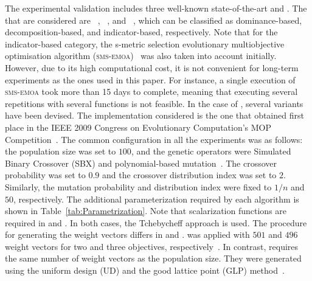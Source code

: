The experimental validation includes three well-known state-of-the-art \MOEAS{} and \VSDMOEA{}.
%
The \MOEAS{} that are considered are \NSGAII{}~\cite{Joel:jMetal}, \MOEAD{}~\cite{MOEADCode}, and \RMOEA{}~\cite{R2EMOACode}, 
which can be classified as dominance-based, decomposition-based, and indicator-based, respectively.
%
Note that for the indicator-based category, the s-metric selection evolutionary multiobjective optimisation algorithm 
(\textsc{sms-emoa})~\cite{Joel:SMSEMOA} was also taken into account initially.
%
However, due to its high computational cost, it is not convenient for long-term experiments as the ones used in this paper.
%
For instance, a single execution of \textsc{sms-emoa} took more than 15 days to complete, meaning that executing several
repetitions with several functions is not feasible.
%
In the case of \MOEAD{}, several variants have been devised.
%
The \MOEAD{} implementation considered is the one that obtained first place in the IEEE 2009 Congress on Evolutionary Computation's 
MOP Competition~\cite{zhang2009performance}.
%
The common configuration in all the experiments was as follows: the population size was set to $100$, and the genetic 
operators were Simulated Binary Crossover (SBX) and polynomial-based 
mutation~\cite{Joel:SBX1994, Joel:Mutation}.
%
The crossover probability was set to $0.9$ and the crossover distribution index was set to $2$.
%
Similarly, the mutation probability and distribution index were fixed to $1/n$ and $50$, respectively.
%
The additional parameterization required by each algorithm is shown in Table~\ref{tab:Parametrization}.
%
Note that scalarization functions are required in \MOEAD{} and \RMOEA{}.
%
In both cases, the Tchebycheff approach is used.
%
The procedure for generating the weight vectors differs in \MOEAD{} and \RMOEA{}.
%
\RMOEA{} was applied with $501$ and $496$ weight vectors for two and three objectives, respectively~\cite{trautmann2013r2}.
%
In contrast, \MOEAD{} requires the same number of weight vectors as the population size.
%
They were generated using the uniform design (UD) and the good lattice point (GLP) method~\cite{Joel:MOEAD_Uniform_Design, Joel:Kuhn_Munkres}.


